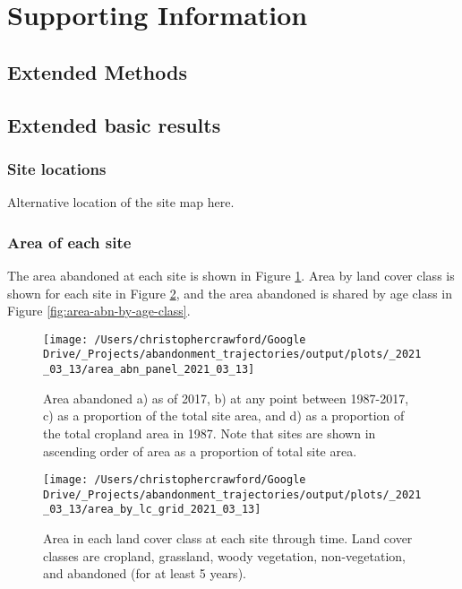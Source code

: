 \documentclass[
]{article}
\begin{document}
\newpage

\hypertarget{supporting-information}{%
\section{Supporting Information}\label{supporting-information}}

\hypertarget{extended-methods}{%
\subsection{Extended Methods}\label{extended-methods}}

\hypertarget{extended-basic-results}{%
\subsection{Extended basic results}\label{extended-basic-results}}

\hypertarget{site-locations}{%
\subsubsection{Site locations}\label{site-locations}}

Alternative location of the site map here.

\hypertarget{area-of-each-site}{%
\subsubsection{Area of each site}\label{area-of-each-site}}

The area abandoned at each site is shown in Figure \ref{fig:area-abn-panel}.
Area by land cover class is shown for each site in Figure \ref{fig:area-by-lc}, and the area abandoned is shared by age class in Figure \ref{fig:area-abn-by-age-class}.



\begin{figure}
\texttt{[image: /Users/christophercrawford/Google Drive/\_Projects/abandonment\_trajectories/output/plots/\_2021\_03\_13/area\_abn\_panel\_2021\_03\_13]} \caption{Area abandoned a) as of 2017, b) at any point between 1987-2017, c) as a proportion of the total site area, and d) as a proportion of the total cropland area in 1987. Note that sites are shown in ascending order of area as a proportion of total site area.}\label{fig:area-abn-panel}
\end{figure}



\begin{figure}
\texttt{[image: /Users/christophercrawford/Google Drive/\_Projects/abandonment\_trajectories/output/plots/\_2021\_03\_13/area\_by\_lc\_grid\_2021\_03\_13]} \caption{Area in each land cover class at each site through time. Land cover classes are cropland, grassland, woody vegetation, non-vegetation, and abandoned (for at least 5 years).}\label{fig:area-by-lc}
\end{figure}
\end{document}
